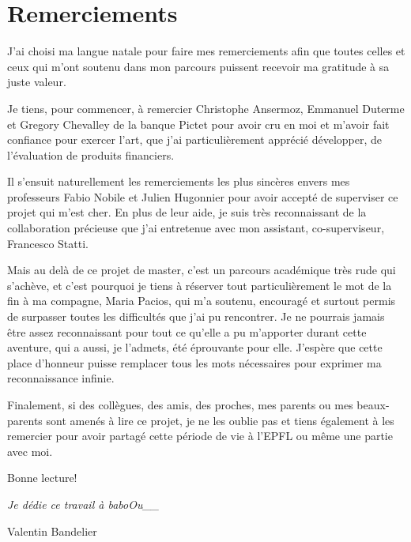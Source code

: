 %
\chapter*{Remerciements}
\label{sec:acknowledgement}
\vspace*{-10mm}

J'ai choisi ma langue natale pour faire mes remerciements afin que toutes celles et ceux qui m'ont soutenu dans mon parcours puissent recevoir ma gratitude à sa juste valeur.

Je tiens, pour commencer, à remercier  Christophe Ansermoz, Emmanuel Duterme et Gregory Chevalley de la banque Pictet pour avoir cru en moi et m'avoir fait confiance pour exercer l'art, que j'ai particulièrement apprécié développer, de l'évaluation de produits financiers. 

Il s'ensuit naturellement les remerciements les plus sincères envers mes professeurs Fabio Nobile et Julien Hugonnier pour avoir accepté de superviser ce projet qui m'est cher. En plus de leur aide, je suis très reconnaissant de la collaboration précieuse que j'ai entretenue avec mon assistant, co-superviseur, Francesco Statti. 

Mais au delà de ce projet de master, c'est un parcours académique très rude qui s'achève, et c'est pourquoi je tiens à réserver tout particulièrement le mot de la fin à ma compagne, Maria Pacios, qui m'a soutenu, encouragé et surtout permis de surpasser toutes les difficultés que j'ai pu rencontrer. Je ne pourrais jamais être assez reconnaissant pour tout ce qu'elle a pu m'apporter durant cette aventure, qui a aussi, je l'admets, été éprouvante pour elle. J'espère que cette place d'honneur puisse remplacer tous les mots nécessaires pour exprimer ma reconnaissance infinie.

Finalement, si des collègues, des amis, des proches, mes parents ou mes beaux-parents sont amenés à lire ce projet, je ne les oublie pas et tiens également à les remercier pour avoir partagé cette période de vie à l'EPFL ou même une partie avec moi.

Bonne lecture!

\hfill \textit{Je dédie ce travail à \MVAt baboOu\_\_}

\hfill Valentin Bandelier 
